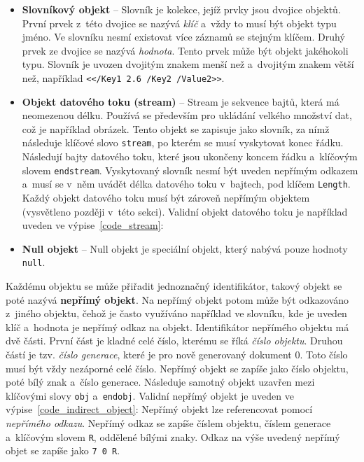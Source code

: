 \begin{itemize}
    \item \textbf{Slovníkový objekt} -- Slovník je kolekce, jejíž prvky jsou
    dvojice objektů. První prvek z~této dvojice se nazývá \emph{klíč} a~vždy to 
    musí být objekt typu jméno. Ve slovníku nesmí existovat více záznamů se
    stejným klíčem. Druhý prvek ze dvojice se nazývá \emph{hodnota}.
    Tento prvek může být objekt jakéhokoli typu. Slovník je uvozen dvojitým znakem
    menší než a~dvojitým znakem větší než, například
    \texttt{<</Key1 2.6 /Key2 /Value2>>}.

    \item \textbf{Objekt datového toku (stream)} -- Stream je sekvence bajtů, 
    která má neomezenou délku. Používá se především pro ukládání velkého množství
    dat, což je například obrázek. Tento objekt se zapisuje jako slovník, za nímž
    následuje klíčové slovo \texttt{stream}, po kterém se musí vyskytovat konec
    řádku. Následují bajty datového toku, které jsou ukončeny koncem řádku
    a~klíčovým slovem \texttt{endstream}. Vyskytovaný slovník nesmí být uveden
    nepřímým odkazem a~musí se v~něm uvádět délka datového toku v~bajtech, pod
    klíčem \texttt{Length}. Každý objekt datového toku musí být zároveň nepřímým
    objektem (vysvětleno později v~této sekci). Validní objekt datového toku je
    například uveden ve výpise~\ref{code_stream}:

    \item \textbf{Null objekt} -- Null objekt je speciální objekt, který nabývá
    pouze hodnoty \texttt{null}.
\end{itemize}

Každému objektu se může přiřadit jednoznačný identifikátor, takový objekt se poté
nazývá \textbf{nepřímý objekt}. Na nepřímý objekt potom může být odkazováno
z~jiného objektu, čehož je často využíváno například ve slovníku, kde je uveden
klíč a~hodnota je nepřímý odkaz na objekt. Identifikátor nepřímého objektu má dvě
části. První část je kladné celé číslo, kterému se říká \emph{číslo objektu}.
Druhou částí je tzv. \emph{číslo generace}, které je pro nově generovaný dokument
0. Toto číslo musí být vždy nezáporné celé číslo. Nepřímý objekt se zapíše jako
číslo objektu, poté bílý znak a~číslo generace. Následuje samotný objekt uzavřen
mezi klíčovými slovy \texttt{obj} a~\texttt{endobj}. Validní nepřímý objekt je
uveden ve výpise~\ref{code_indirect_object}:
\noindent Nepřímý objekt lze referencovat pomocí \emph{nepřímého odkazu}.
Nepřímý odkaz se zapíše číslem objektu, číslem generace a~klíčovým slovem
\texttt{R}, oddělené bílými znaky. Odkaz na výše uvedený nepřímý objet se zapíše
jako \texttt{7 0 R}.


